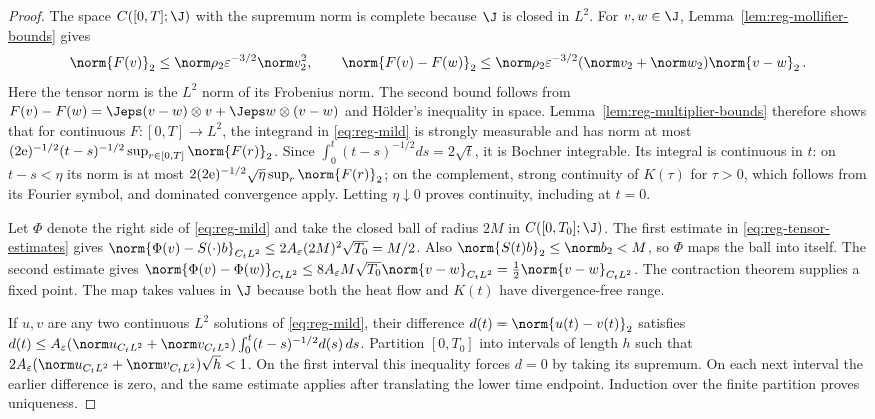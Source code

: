 \documentclass[11pt,reqno]{amsart}
\begin{document}
\begin{proof}
The space $C([0,T];\J)$ with the supremum norm is complete because $\J$ is
closed in $L^2$. For $v,w\in\J$, Lemma~\ref{lem:reg-mollifier-bounds}
gives
\begin{equation}\label{eq:reg-tensor-estimates}
  \norm{F(v)}_2\le\norm\rho_2\varepsilon^{-3/2}\norm v_2^2,\qquad
  \norm{F(v)-F(w)}_2\le\norm\rho_2\varepsilon^{-3/2}
    (\norm v_2+\norm w_2)\norm{v-w}_2\,.
\end{equation}
Here the tensor norm is the $L^2$ norm of its Frobenius norm. The second
bound follows from
$F(v)-F(w)=\Jeps(v-w)\otimes v+\Jeps w\otimes(v-w)$ and Hölder's
inequality in space. Lemma~\ref{lem:reg-multiplier-bounds} therefore shows
that for continuous $F:[0,T]\to L^2$, the integrand in
\eqref{eq:reg-mild} is strongly measurable and has norm at most
$(2\mathrm e)^{-1/2}(t-s)^{-1/2}\sup_{r\in[0,T]}\norm{F(r)}_2$. Since
$\int_0^t(t-s)^{-1/2}ds=2\sqrt t$, it is Bochner integrable. Its integral
is continuous in $t$: on $t-s<\eta$ its norm is at most
$2(2\mathrm e)^{-1/2}\sqrt\eta\sup_r\norm{F(r)}_2$; on the complement,
strong continuity of $K(\tau)$ for $\tau>0$, which follows from its Fourier
symbol, and dominated convergence apply. Letting
$\eta\downarrow0$ proves continuity, including at $t=0$.

Let $\Phi$ denote the right side of \eqref{eq:reg-mild} and take the closed
ball of radius $2M$ in $C([0,T_0];\J)$. The first estimate in
\eqref{eq:reg-tensor-estimates} gives
$\norm{\Phi(v)-S(\cdot)b}_{C_tL^2}\le2A_\varepsilon(2M)^2\sqrt{T_0}=M/2$.
Also $\norm{S(t)b}_2\le\norm b_2<M$, so $\Phi$ maps the ball into
itself. The second estimate gives
$\norm{\Phi(v)-\Phi(w)}_{C_tL^2}\le
8A_\varepsilon M\sqrt{T_0}\norm{v-w}_{C_tL^2}=\frac12\norm{v-w}_{C_tL^2}$.
The contraction theorem supplies a fixed point. The map takes values in
$\J$ because both the heat flow and $K(t)$ have divergence-free range.

If $u,v$ are any two continuous $L^2$ solutions of
\eqref{eq:reg-mild}, their difference $d(t)=\norm{u(t)-v(t)}_2$ satisfies
$d(t)\le A_\varepsilon(\norm u_{C_tL^2}+\norm v_{C_tL^2})
\int_0^t(t-s)^{-1/2}d(s)\,ds$. Partition $[0,T_0]$ into intervals of
length $h$ such that
$2A_\varepsilon(\norm u_{C_tL^2}+\norm v_{C_tL^2})\sqrt h<1$. On the
first interval this inequality forces $d=0$ by taking its supremum. On
each next interval the earlier difference is zero, and the same estimate
applies after translating the lower time endpoint. Induction over the
finite partition proves uniqueness.
\end{proof}
\end{document}
